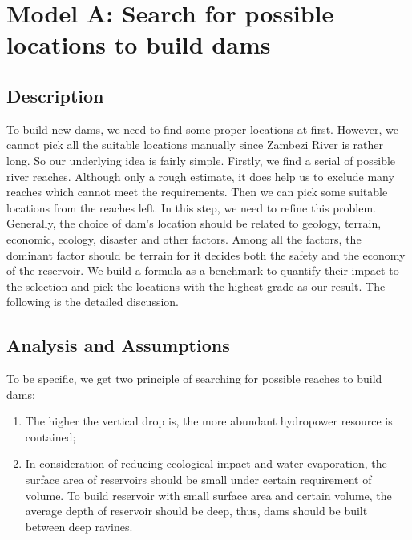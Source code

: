 \documentclass{mcmthesis}
\begin{document}

\section{Model A: Search for possible locations to build dams}
\subsection{Description}
\indent \indent To build new dams, we need to find some proper locations at first. However, we cannot pick all the suitable locations manually since Zambezi River is rather long. So our underlying idea is fairly simple. Firstly, we find a serial of possible river reaches. Although only a rough estimate, it does help us to exclude many reaches which cannot meet the requirements. Then we can pick some suitable locations from the reaches left. In this step, we need to refine this problem. Generally, the choice of dam's location should be related to geology, terrain, economic, ecology, disaster and other factors. Among all the factors, the dominant factor should be terrain for it decides both the safety and the economy of the reservoir. We build a formula as a benchmark to quantify their impact to the selection and pick the locations with the highest grade as our result. The following is the detailed discussion. 
\subsection{Analysis and Assumptions}
\indent \indent To be specific, we get two principle of searching for possible reaches to build dams:
\begin{enumerate}
  \setlength{\itemsep}{0pt}
  \setlength{\parsep}{0pt}
  \setlength{\parskip}{0pt}
  \item The higher the vertical drop is, the more abundant hydropower resource is contained;
  \item In consideration of reducing ecological impact and water evaporation, the surface area of reservoirs should be small under certain requirement of volume. To build reservoir with small surface area and certain volume, the average depth of reservoir should be deep, thus, dams should be built between deep ravines.
\end{enumerate}
\end{document}
